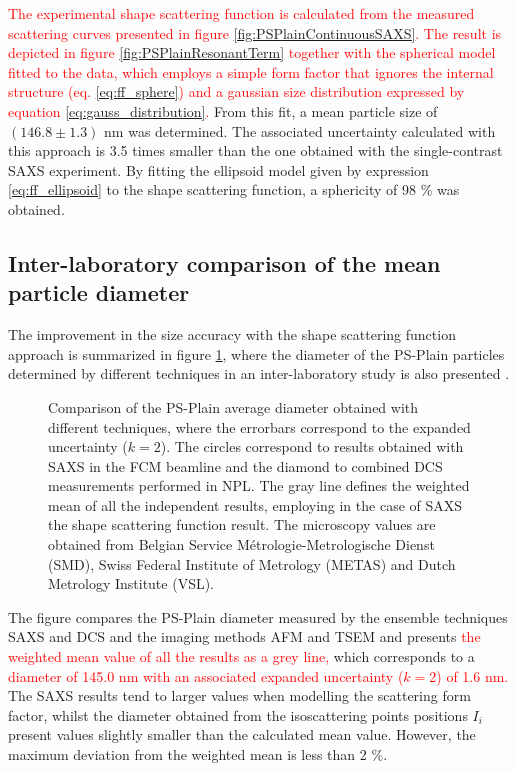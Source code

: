 \textcolor{red}{The experimental shape scattering function is calculated from the measured scattering curves presented in figure \ref{fig:PSPlainContinuousSAXS}. The result is depicted in figure \ref{fig:PSPlainResonantTerm} together with the spherical model fitted to the data, which employs a simple form factor that ignores the internal structure (eq. \ref{eq:ff_sphere}) and a gaussian size distribution expressed by equation \ref{eq:gauss_distribution}.} From this fit, a mean particle size of $(146.8\pm1.3)$ nm was determined. The associated uncertainty calculated with this approach is 3.5 times smaller than the one obtained with the single-contrast SAXS experiment. By fitting the ellipsoid model given by expression \ref{eq:ff_ellipsoid} to the shape scattering function, a sphericity of 98 $\%$ was obtained.

\subsection{Inter-laboratory comparison of the mean particle diameter}
\label{sec:interlab_size_comparison}
The improvement in the size accuracy with the shape scattering function approach is summarized in figure \ref{fig:PSPlainSizeComparison}, where the diameter of the PS-Plain particles determined by different techniques in an inter-laboratory study is also presented \citep{nicolet_inter-laboratory_2016}.

\begin{figure}
	\centering
		
	\caption[Comparison of the PS-Plain particles average diameter with different techniques.]{Comparison of the PS-Plain average diameter obtained with different techniques, where the errorbars correspond to the expanded uncertainty ($k=2$). The circles correspond to results obtained with SAXS in the FCM beamline and the diamond to combined DCS measurements performed in NPL. The gray line defines the weighted mean of all the independent results, employing in the case of SAXS the shape scattering function result. The microscopy values are obtained from Belgian Service Métrologie-Metrologische Dienst (SMD), Swiss Federal Institute of Metrology (METAS) and Dutch Metrology Institute (VSL).}
	\label{fig:PSPlainSizeComparison}
\end{figure}

The figure compares the PS-Plain diameter measured by the ensemble techniques SAXS and DCS and the imaging methods AFM and TSEM and presents \textcolor{red}{the weighted mean value of all the results as a grey line,} which corresponds to a \textcolor{red}{diameter of 145.0 nm with an associated expanded uncertainty ($k=2$) of 1.6 nm.} The SAXS results tend to larger values when modelling the scattering form factor, whilst the diameter obtained from the isoscattering points positions $I_i$ present values slightly smaller than the calculated mean value. However, the maximum deviation from the weighted mean is less than 2 $\%$.

